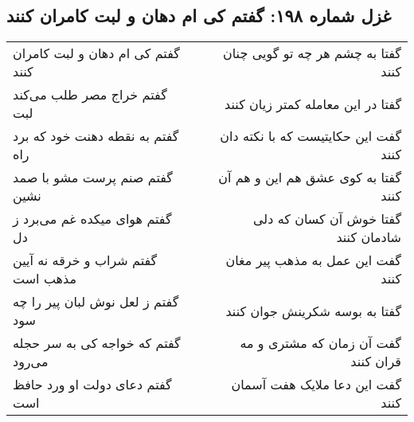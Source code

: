 \begin{center}
\section*{غزل شماره ۱۹۸: گفتم کی ام دهان و لبت کامران کنند}
\label{sec:sh198}
\begin{longtable}{l p{0.5cm} r}
گفتم کی ام دهان و لبت کامران کنند
&&
گفتا به چشم هر چه تو گویی چنان کنند
\\
گفتم خراج مصر طلب می‌کند لبت
&&
گفتا در این معامله کمتر زیان کنند
\\
گفتم به نقطه دهنت خود که برد راه
&&
گفت این حکایتیست که با نکته دان کنند
\\
گفتم صنم پرست مشو با صمد نشین
&&
گفتا به کوی عشق هم این و هم آن کنند
\\
گفتم هوای میکده غم می‌برد ز دل
&&
گفتا خوش آن کسان که دلی شادمان کنند
\\
گفتم شراب و خرقه نه آیین مذهب است
&&
گفت این عمل به مذهب پیر مغان کنند
\\
گفتم ز لعل نوش لبان پیر را چه سود
&&
گفتا به بوسه شکرینش جوان کنند
\\
گفتم که خواجه کی به سر حجله می‌رود
&&
گفت آن زمان که مشتری و مه قران کنند
\\
گفتم دعای دولت او ورد حافظ است
&&
گفت این دعا ملایک هفت آسمان کنند
\\
\end{longtable}
\end{center}
